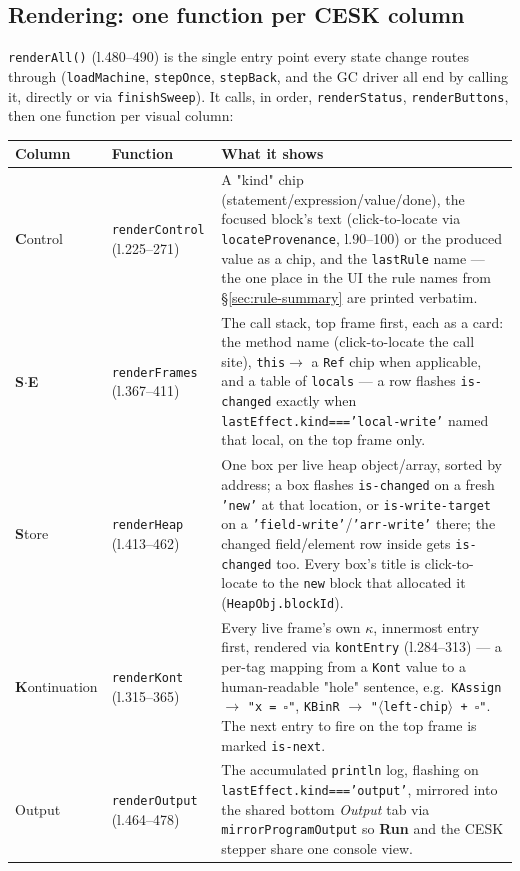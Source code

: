 \documentclass[11pt]{article}
\begin{document}
\subsection{Rendering: one function per CESK column}

\texttt{renderAll()} (l.480--490) is the single entry point every state
change routes through (\texttt{loadMachine}, \texttt{stepOnce},
\texttt{stepBack}, and the GC driver all end by calling it, directly or via
\texttt{finishSweep}). It calls, in order, \texttt{renderStatus},
\texttt{renderButtons}, then one function per visual column:

\begin{center}
\begin{longtable}{@{}p{2.6cm}p{2.6cm}p{9.9cm}@{}}
\toprule
\textbf{Column} & \textbf{Function} & \textbf{What it shows} \\
\midrule
\endhead
\textbf{C}ontrol &
  \texttt{renderControl} (l.225--271) &
  A "kind" chip (statement/expression/value/done), the focused block's text
  (click-to-locate via \texttt{locateProvenance}, l.90--100) or the
  produced value as a chip, and the \texttt{lastRule} name --- the one
  place in the UI the rule names from \S\ref{sec:rule-summary} are printed
  verbatim. \\
\textbf{S}$\cdot$\textbf{E} &
  \texttt{renderFrames} (l.367--411) &
  The call stack, top frame first, each as a card: the method name
  (click-to-locate the call site), \texttt{this}$\to$ a \texttt{Ref} chip
  when applicable, and a table of \texttt{locals} --- a row flashes
  \texttt{is-changed} exactly when \texttt{lastEffect.kind==='local-write'}
  named that local, on the top frame only. \\
\textbf{S}tore &
  \texttt{renderHeap} (l.413--462) &
  One box per live heap object/array, sorted by address; a box flashes
  \texttt{is-changed} on a fresh \texttt{'new'} at that location, or
  \texttt{is-write-target} on a \texttt{'field-write'}/\texttt{'arr-write'}
  there; the changed field/element row inside gets \texttt{is-changed}
  too. Every box's title is click-to-locate to the \texttt{new} block that
  allocated it (\texttt{HeapObj.blockId}). \\
\textbf{K}ontinuation &
  \texttt{renderKont} (l.315--365) &
  Every live frame's own $\kappa$, innermost entry first, rendered via
  \texttt{kontEntry} (l.284--313) --- a per-tag mapping from a \texttt{Kont}
  value to a human-readable "hole" sentence, e.g.\ \texttt{KAssign} $\to$
  \texttt{"x = $\square$"}, \texttt{KBinR} $\to$ \texttt{"$\langle$left-chip$\rangle$ + $\square$"}. The
  next entry to fire on the top frame is marked \texttt{is-next}. \\
Output &
  \texttt{renderOutput} (l.464--478) &
  The accumulated \texttt{println} log, flashing on
  \texttt{lastEffect.kind==='output'}, mirrored into the shared bottom
  \emph{Output} tab via \texttt{mirrorProgramOutput} so \textbf{Run} and
  the CESK stepper share one console view. \\
\bottomrule
\end{longtable}
\end{center}
\end{document}
